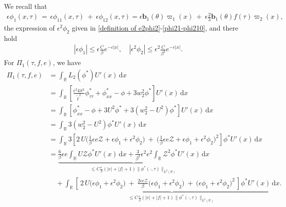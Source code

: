 \documentclass[10pt, reqno]{amsart}
\numberwithin{equation}{section}
\theoremstyle{definition}
\begin{document}
{ We recall that
\begin{align*}
\epsilon\phi_1(x, \tau)
\,=\, \epsilon{\phi_{11}}(x, \tau) \ +\ \epsilon{\phi_{12}}(x, \tau)
= \epsilon{\mathbf b}_1(\theta)\varpi_1(x)
\ +\
\epsilon\frac{2}{3} {\mathbf b}_1(\theta)f(\tau) \varpi_2(x),
\end{align*}
the expression of $\epsilon^2\phi_2$ given in \eqref{definition of e2phi2}-\eqref{phi21-phi210},
 and there hold
\begin{align*}
 |\epsilon\phi_1| \leq \epsilon \frac{C}{\beta} e^{-c|x|}, \quad |\epsilon^2\phi_2| \leq \epsilon^2 \frac{C}{\beta^2} e^{-c|x|}.
\end{align*}
 For $\Pi_1(\tau, f, e) $, we have
\begin{align*}
 \Pi_1 (\tau, f, e) & = \int_{{\mathbb R}} L_2(\phi^*) U'(x)\,{\mathrm d}x
\nonumber\\[2mm]
 & =
\int_{{\mathbb R}}\left[ \frac{\epsilon^2 4\pi^2}{{\tilde\ell}^2} \phi^*_{\tau\tau} + \phi^*_{xx} - \phi+ 3w_2^2 \phi^* \right] U'(x)\,{\mathrm d}x
\nonumber\\[2mm]
 & =\int_{{\mathbb R}}\left[\phi^*_{xx} - \phi+ 3U^2 \phi^* + 3\left(w_2^2 - U^2 \right) \phi^* \right] U'(x)\,{\mathrm d}x
\nonumber\\[2mm]
 & =\int_{{\mathbb R}} 3\left(w_2^2 - U^2 \right) \phi^* U'(x)\,{\mathrm d}x
\nonumber\\[2mm]
 & =\int_{{\mathbb R}} 3\left[2\, U \Big( \frac1\beta\epsilon e \mathcal{Z}+\epsilon \phi_1+ \epsilon^2\phi_2 \Big)
\ +\
\Big(\frac1\beta\epsilon e \mathcal{Z}+\epsilon \phi_1+ \epsilon^2\phi_2 \Big)^2\right] \phi^* U'(x)\,{\mathrm d}x
\nonumber\\[2mm]
 & = \underbrace{ \frac6\beta \epsilon e \int_{{\mathbb R}} U\mathcal Z \phi^* U'(x)\,{\mathrm d}x + \frac3{\beta^2}\epsilon^2 e^2 \int_{{\mathbb R}}{\mathcal Z}^2 \phi^* U'(x)\,{\mathrm d}x}_{\le C\frac\epsilon\beta \left(|e| + |f| +1\right) \|\phi^*(\cdot, \tau)\|_{L^2({\mathbb R})} }
\nonumber\\[2mm]
 & \quad+\underbrace{ \int_{{\mathbb R}} \left[\,2\, U \Big(\epsilon \phi_1+ \epsilon^2\phi_2 \Big)
 \ +\ \frac{2 \epsilon e \mathcal{Z}} \beta\Big(\epsilon \phi_1+ \epsilon^2\phi_2 \Big)
 \ +\ \Big(\epsilon \phi_1+ \epsilon^2\phi_2 \Big)^2 \,\right] \phi^* U'(x)\,{\mathrm d}x}_{\le C\frac{\epsilon}{\beta} \left( |e| + |f| + 1 \right) \|\phi^*(\cdot, \tau)\|_{L^2({\mathbb R})}}.
\end{align*}

}
\end{document}
